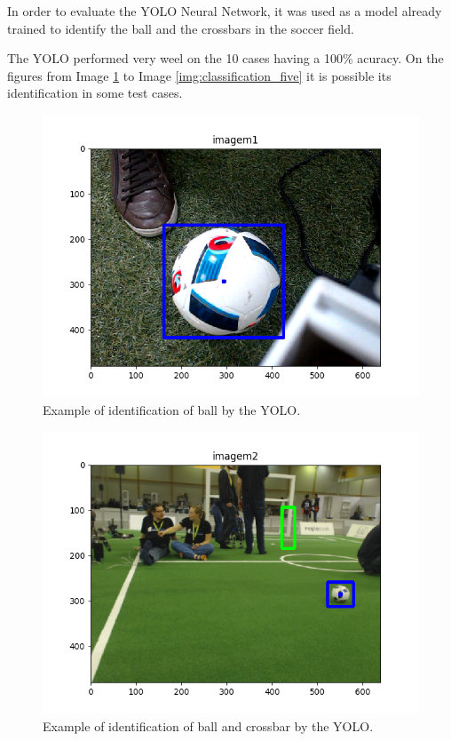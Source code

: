 \documentclass[journal,12pt,onecolumn,draftclsnofoot,]{IEEEtran}
\begin{document}
In order to evaluate the YOLO Neural Network, it was used as a model already trained to identify the ball and the crossbars in the soccer field.

The YOLO performed very weel on the 10 cases having a 100\% acuracy. On the figures from Image \ref{img:classification_one} to Image \ref{img:classification_five} it is possible its identification in some test cases.

\begin{figure}
  \begin{center}
  \includegraphics[width=5in]{./../code/imagem1_detection.png}
  \caption{Example of identification of ball by the YOLO.}
  \label{img:classification_one}
  \end{center}
\end{figure}

\begin{figure}
  \begin{center}
  \includegraphics[width=5in]{./../code/imagem2_detection.png}
  \caption{Example of identification of ball and crossbar by the YOLO.}
  \label{img:classification_two}
  \end{center}
\end{figure}
\end{document}
